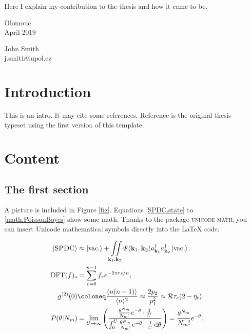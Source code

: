 \documentclass[a4paper,12pt,twoside]{report}
\begin{document}
Here I explain my contribution to the thesis and how it came to be.

\lipsum[1-4]

\lipsum[6-8]

\vspace{1cm}

\noindent
\parbox{.4\textwidth}{
Olomouc
\\
April 2019
}
\hfill
\parbox{.4\textwidth}{\flushright
John Smith
\\
j.smith@upol.cz
}

\clearpage
\pagestyle{empty}
\cleardoublepage

\pagestyle{fancy}


\chapter{Introduction}
\label{chapter.intro}

This is an intro.\autocite{Smith2017} It may cite some references.\autocite{Migdall2013Book,Straka2014,Straka2018Apr,Straka2019Thesis} Reference  is the original thesis typeset using the first version of this template.

\lipsum[1-4]

\lipsum[6-9]

\lipsum[11-12]

\chapter{Content}

\section{The first section}

A picture is included in Figure \ref{fig}. Equations \eqref{SPDC.state} to \eqref{math.PoissonBayes} show some math. Thanks to the package \textsc{unicode-math}, you can insert Unicode mathematical symbols directly into the \LaTeX{} code.

\begin{align}\label{SPDC.state}
\left| \text{\sc SPDC} \right> &\approx \left| \text{vac.} \right> + \iint\limits_{\mathbf{k}_1,\mathbf{k}_2} \varPsi(\mathbf{k}_1,\mathbf{k}_2)a^\dagger_{\mathbf{k}_1}a^\dagger_{\mathbf{k}_2} \left|\text{vac.} \right>.
\\
\text{DFT}(f)_s &= \sum_{r=0}^{n-1} f_r e^{-2\pi r s/n},
\\
g^{(2)}(0) &\coloneq \frac{\langle n(n-1) \rangle}{\langle n \rangle^2} \approx \frac{2 p_2}{p_1^2} \approx \mathcal{R}\tau_c (2-\eta_t).
\\
\label{math.PoissonBayes}
P(\theta|N_m) &= \lim_{U \rightarrow \infty} \left( \frac{\frac{\theta^{N_m}}{N_m!} e^{-\theta} \cdot \frac{1}{U}}{\int_0^U \frac{\theta^{N_m}}{N_m!} e^{-\theta} \cdot \frac{1}{U}\,\text{d}\theta} \right) = \frac{\theta^{N_m}}{N_m!} e^{-\theta}.
\end{align}
\end{document}

